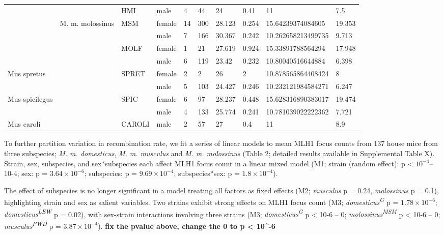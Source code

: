 \documentclass[
]{article}
\begin{document}
\begin{table}[H]
{\begin{tabular}{l|l|l|l|l|l|l|l|l|l}
\cline{3-10}
 & \multirow{-2}{*}{\raggedright\arraybackslash } & HMI & male & 4 & 44 & 24 & 0.41 & 11 & 7.5\\
\cline{2-10}
 & M. m. molossinus & MSM & female & 14 & 300 & 28.123 & 0.254 & 15.64239374084605 & 19.353\\
\cline{2-10}
 &  &  & male & 7 & 166 & 30.367 & 0.242 & 10.262658213499735 & 9.713\\
\cline{3-10}
 &  & MOLF & female & 1 & 21 & 27.619 & 0.924 & 15.33891788564294 & 17.948\\
\cline{3-10}
\multirow{-22}{*}{\raggedright\arraybackslash } &  &  & male & 6 & 119 & 23.42 & 0.232 & 10.80040516644884 & 6.398\\
\cline{1-1}
\cline{3-10}
Mus spretus &  & SPRET & female & 2 & 2 & 26 & 2 & 10.878565864408424 & 8\\
\cline{1-1}
\cline{3-10}
 &  &  & male & 5 & 103 & 24.427 & 0.246 & 10.232121984584271 & 6.247\\
\cline{1-1}
\cline{3-10}
Mus spicilegus &  & SPIC & female & 6 & 97 & 28.237 & 0.448 & 15.628316890383017 & 19.474\\
\cline{1-1}
\cline{3-10}
 &  &  & male & 4 & 133 & 25.774 & 0.241 & 10.781039022222362 & 7.721\\
\cline{1-1}
\cline{3-10}
Mus caroli & \multirow{-8}{*}{\raggedright\arraybackslash } & CAROLI & male & 2 & 57 & 27 & 0.4 & 11 & 8.9\\
\hline
\end{tabular}}
\end{table}

To further partition variation in recombination rate, we fit a series of
linear models to mean MLH1 focus counts from 137 house mice from three
subspecies; \emph{M. m. domesticus}, \emph{M. m. musculus} and \emph{M.
m. molossinus} (Table 2; detailed results available in Supplemental
Table X). Strain, sex, subspecies, and sex*subspecies each affect MLH1
focus count in a linear mixed model (M1; strain (random effect): p
\textless{} \ensuremath{10^{-4}}-- 10-4; sex: p =
\ensuremath{3.64\times 10^{-6}}; subspecies: p =
\ensuremath{9.69\times 10^{-4}}; subspecies*sex: p =
\ensuremath{1.8\times 10^{-4}}).

The effect of subspecies is no longer significant in a model treating
all factors as fixed effects (M2; \emph{musculus} p = 0.24,
\emph{molossinus} p = 0.1), highlighting strain and sex as salient
variables. Two strains exhibit strong effects on MLH1 focus count (M3;
\emph{domesticus\textsuperscript{G}} p =
\ensuremath{1.78\times 10^{-6}}; \emph{domesticus\textsuperscript{LEW}}
p = 0.02), with sex-strain interactions involving three strains (M3;
\emph{domesticus\textsuperscript{G}} p \textless{} 10-6 -- 0;
\emph{molossinus\textsuperscript{MSM}} p \textless{} 10-6 -- 0;
\emph{musculus\textsuperscript{PWD}} p =
\ensuremath{3.87\times 10^{-4}}). \textbf{fix the pvalue above, change
the 0 to p \textless{} 10\^{}-6}
\end{document}
